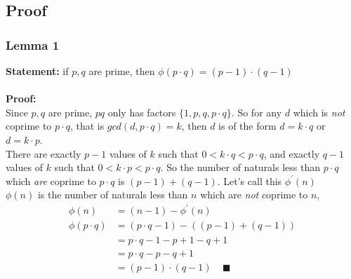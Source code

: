 \documentclass{article}
\begin{document}
\subsection{Proof}
\subsubsection{Lemma 1}
\textbf{Statement:} if $p, q$ are prime, then $\phi(p \cdot q) = (p-1) \cdot (q-1)$ \\\\
\textbf{Proof:} \\
Since $p, q$ are prime, $pq$ only has factors $\{1, p, q, p \cdot q\}$.
So for any $d$ which is \emph{not} coprime to $p \cdot q$, that is $gcd(d, p \cdot q) = k$,
then $d$ is of the form $d=k \cdot q$ or $d= k \cdot p$. \\
There are exactly $p-1$ values of $k$ such that $0 < k \cdot q < p \cdot q$,
and exactly $q-1$ values of $k$ such that  $0 < k \cdot p < p \cdot q$.
So the number of naturals less than $p \cdot q$ which \emph{are} coprime to $p \cdot q$ is $(p-1) + (q-1)$. Let's call this $\phi^{'}(n)$\\
$\phi(n)$ is the number of naturals less than $n$ which are \emph{not} coprime to $n$,
\begin{align*}
    \phi(n)        & = (n-1) - \phi^{'}(n)                           \\
    \phi(p\cdot q) & = (p \cdot q - 1) - \left( (p-1) + (q-1)\right) \\
                   & = p \cdot q - 1 - p + 1 - q + 1                 \\
                   & = p \cdot q - p - q + 1                         \\
                   & = (p-1) \cdot (q-1)  \;\;\;\; \blacksquare
\end{align*}
\end{document}
